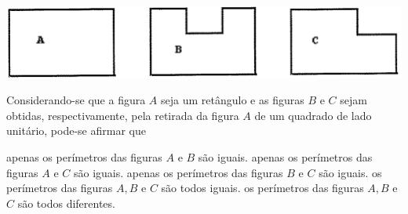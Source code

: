 \begin{question}%

    
    \includegraphics[width=.5\textwidth]{CONCURSO/EAM/IMAGES/2005/EAM200515IMG.png}

Considerando-se que a figura \(A\) seja um retângulo e as figuras \(B\) e \(C\) sejam obtidas, respectivamente, pela retirada da figura \(A\) de um quadrado de lado unitário, pode-se afirmar que
    \begin{tasks}
        \task apenas os perímetros das figuras \(A\) e \(B\) são iguais.
        \task apenas os perímetros das figuras \(A\) e \(C\) são iguais.
        \task apenas os perímetros das figuras \(B\) e \(C\) são iguais.
        \task os perímetros das figuras \(A,B\) e \(C\) são todos iguais.
        \task os perímetros das figuras \(A,B\) e \(C\) são todos diferentes.
    \end{tasks}
\end{question}
